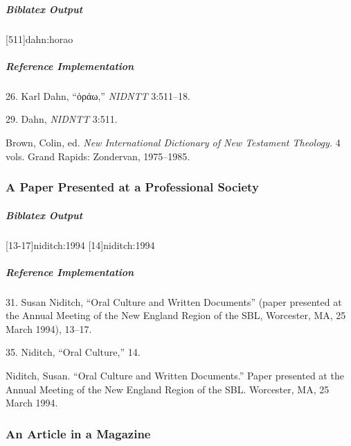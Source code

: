 \documentclass[a4paper]{article}
\newcommand{\textgreek}[1]{{\greekfont #1}}
\newenvironment{biboutput}{%
  \subparagraph{Biblatex Output}
}{\color{black}}
\newenvironment{refimp}{%
  \subparagraph{Reference Implementation}
  \color{reference-colour}
  \rm
}{\par\color{black}}
\begin{document}
\begin{biboutput}
  [511]{dahn:horao}
\end{biboutput}

\begin{refimp}
  \hspace*{\bibindent}26. Karl Dahn, “\textgreek{ὁράω},” \emph{NIDNTT} 3:511–18.

  \hspace*{\bibindent}29. Dahn, \emph{NIDNTT} 3:511.

  \hangindent\bibindent Brown, Colin, ed. \emph{New International Dictionary
  of New Testament Theology.} 4 vols. Grand Rapids: Zondervan, 1975–1985.

\end{refimp}

\subsubsection{A Paper Presented at a Professional Society}

\begin{biboutput}
  [13-17]{niditch:1994}
  [14]{niditch:1994}
\end{biboutput}

\begin{refimp}
  \hspace*{\bibindent}31. Susan Niditch, “Oral Culture and Written Documents”
  (paper presented at the Annual Meeting of the New England Region of the SBL,
  Worcester, MA, 25 March 1994), 13–17.

  \hspace*{\bibindent}35. Niditch, “Oral Culture,” 14.

  \hangindent\bibindent Niditch, Susan. “Oral Culture and Written Documents.”
  Paper presented at the Annual Meeting of the New England Region of the SBL.
  Worcester, MA, 25 March 1994.

\end{refimp}

\subsubsection{An Article in a Magazine}
\end{document}
